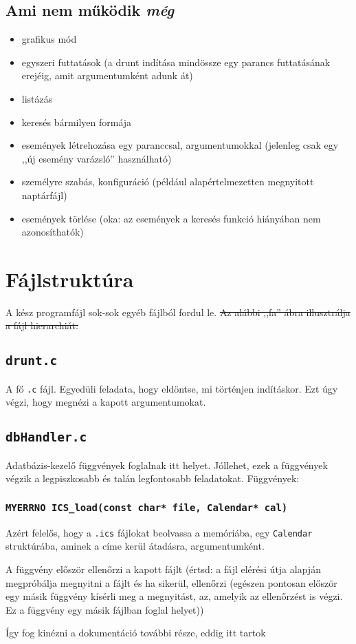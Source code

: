 \documentclass[a4paper]{article}
\begin{document}
\subsection{Ami nem működik \textit{még}}
\begin{itemize}
	\item grafikus mód
	\item egyszeri futtatások (a drunt indítása mindössze egy parancs futtatásának erejéig, amit argumentumként adunk át)
	\item listázás
	\item keresés bármilyen formája
	\item események létrehozása egy paranccsal, argumentumokkal (jelenleg csak egy ,,új esemény varázsló'' használható)
	\item személyre szabás, konfiguráció (például alapértelmezetten megnyitott naptárfájl)
	\item események törlése (oka: az események a keresés funkció hiányában nem azonosíthatók)
\end{itemize}

\pagebreak

\section{Fájlstruktúra}

A kész programfájl sok-sok egyéb fájlból fordul le. \sout{Az alábbi ,,fa'' ábra illusztrálja a fájl hierarchiát.}

\subsection{\texttt{drunt.c}}

A fő \texttt{.c} fájl. Egyedüli feladata, hogy eldöntse, mi történjen indításkor. Ezt úgy végzi, hogy megnézi a kapott argumentumokat.

\subsection{\texttt{dbHandler.c}}

Adatbázis-kezelő függvények foglalnak itt helyet. Jóllehet, ezek a függvények végzik a legpiszkosabb és talán legfontosabb feladatokat. Függvények:

\subsubsection{\texttt{MYERRNO ICS\_load(const char* file, Calendar* cal)}}

Azért felelős, hogy a \texttt{.ics} fájlokat beolvassa a memóriába, egy \texttt{Calendar} struktúrába, aminek a címe kerül átadásra, argumentumként.

A függvény először ellenőrzi a kapott fájlt (értsd: a fájl elérési útja alapján megpróbálja megnyitni a fájlt és ha sikerül, ellenőrzi (egészen pontosan először egy másik függvény kísérli meg a megnyitást, az, amelyik az ellenőrzést is végzi. Ez a függvény egy másik fájlban foglal helyet))

{ \centering \Huge Így fog kinézni a dokumentáció további része, eddig itt tartok }


	
\end{document}
